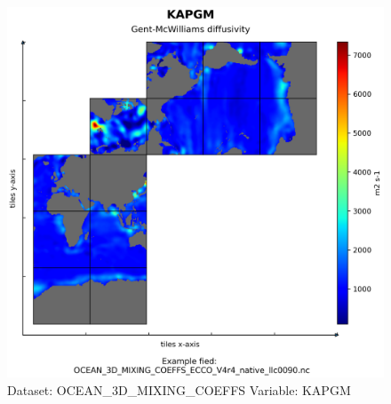 \begin{figure}[H]
\centering
\includegraphics[scale=0.55]{../images/plots/native_plots/Ocean_3D_Gent-Mcwilliams_Redi_and_Background_Vertical_Diffusivity_Coefficients_for_the_Lat-Lon-Cap_90_(llc90)_Native_Model_Grid_(Version_4_Release_4)/KAPGM.png}
\caption{Dataset: OCEAN\_3D\_MIXING\_COEFFS Variable: KAPGM}
\label{tab:table-OCEAN_3D_MIXING_COEFFS_KAPGM-Plot}
\end{figure}
\pagebreak
